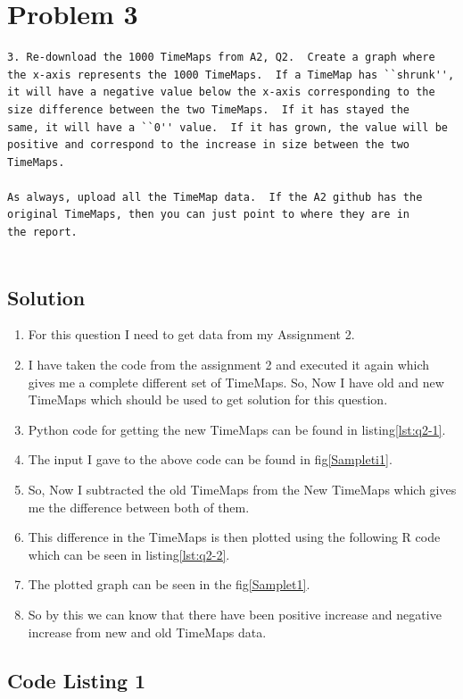 

\section{Problem 3}
\label{part3}
\begin{verbatim}
3. Re-download the 1000 TimeMaps from A2, Q2.  Create a graph where
the x-axis represents the 1000 TimeMaps.  If a TimeMap has ``shrunk'',
it will have a negative value below the x-axis corresponding to the
size difference between the two TimeMaps.  If it has stayed the
same, it will have a ``0'' value.  If it has grown, the value will be 
positive and correspond to the increase in size between the two
TimeMaps.

As always, upload all the TimeMap data.  If the A2 github has the 
original TimeMaps, then you can just point to where they are in 
the report.


\end{verbatim}

\subsection{Solution}
\begin{enumerate}
\item For this question I need to get data from my Assignment 2.
\item I have taken the code from the assignment 2 and executed it again which gives me a complete different set of TimeMaps. So, Now I have old and new TimeMaps which should be used to get solution for this question.
\item Python code for getting the new TimeMaps can be found in listing\ref{lst:q2-1}.
\item The input I gave to the above code can be found in fig\ref{Sampleti1}.
\item So, Now I subtracted the old TimeMaps from the New TimeMaps which gives me the difference between both of them.
\item This difference in the TimeMaps is then plotted using the following R code which can be seen in listing\ref{lst:q2-2}.
\item The plotted graph can be seen in the fig\ref{Samplet1}.
\item So by this we can know that there have been positive increase and negative increase from new and old TimeMaps data.
\end{enumerate}
\newpage

\subsection{Code Listing 1}

